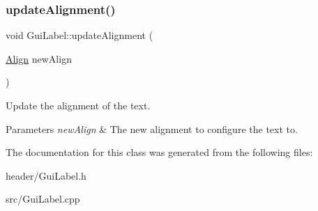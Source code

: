 \subsubsection{\texorpdfstring{update\+Alignment()}{updateAlignment()}}
{\footnotesize\ttfamily void Gui\+Label\+::update\+Alignment (\begin{DoxyParamCaption}\item[{\mbox{\hyperlink{class_gui_label_a408cd142a14adb06d632ed44e674ddf2}{Align}}}]{new\+Align }\end{DoxyParamCaption})}



Update the alignment of the text. 


\begin{DoxyParams}{Parameters}
{\em new\+Align} & The new alignment to configure the text to. \\
\hline
\end{DoxyParams}


The documentation for this class was generated from the following files\+:\begin{DoxyCompactItemize}
\item 
header/Gui\+Label.\+h\item 
src/Gui\+Label.\+cpp\end{DoxyCompactItemize}
